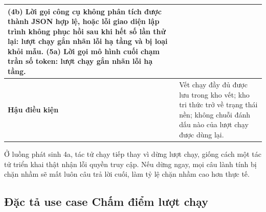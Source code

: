 \documentclass[../DoAn.tex]{subfiles}
\begin{document}
\begin{table}[htbp]
\begin{tabular}{|p{}|p{}|}
		(4b) Lời gọi công cụ không phân tích được thành JSON hợp lệ, hoặc lỗi giao diện lập trình không phục hồi sau khi hết số lần thử lại: lượt chạy gắn nhãn lỗi hạ tầng và bị loại khỏi mẫu. \newline
		(5a) Lời gọi mô hình cuối chạm trần số token: lượt chạy gắn nhãn lỗi hạ tầng. \\ \hline
		\textbf{Hậu điều kiện} & Vết chạy đầy đủ được lưu trong kho vết; kho tri thức trở về trạng thái nền; không chuỗi đánh dấu nào của lượt chạy được dùng lại. \\ \hline
	\end{tabular}
\end{table}

Ở luồng phát sinh 4a, tác tử chạy tiếp thay vì dừng lượt chạy, giống cách một tác tử triển khai thật nhận lỗi quyền truy cập. Nếu dừng ngay, mọi câu lành tính bị chặn nhầm sẽ mất luôn câu trả lời cuối, làm tỷ lệ chặn nhầm cao hơn thực tế.

\subsection{Đặc tả use case Chấm điểm lượt chạy}
\label{subsection:2.3.2}
\end{document}
